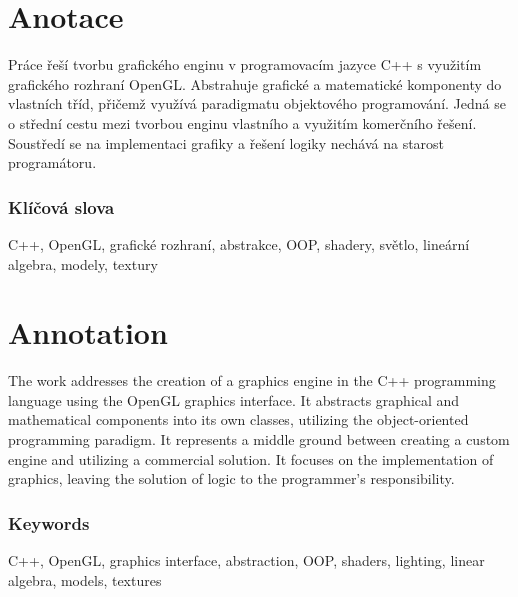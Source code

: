 \section*{Anotace}

Práce řeší tvorbu grafického enginu v programovacím jazyce C++ s využitím grafického rozhraní OpenGL. Abstrahuje grafické a matematické komponenty do vlastních tříd, přičemž využívá paradigmatu objektového programování. Jedná se o střední cestu mezi tvorbou enginu vlastního a využitím komerčního řešení. Soustředí se na implementaci grafiky a řešení logiky nechává na starost programátoru.

\subsubsection*{Klíčová slova}

C++, OpenGL, grafické rozhraní, abstrakce, OOP, shadery, světlo, lineární algebra, modely, textury

\section*{Annotation}

The work addresses the creation of a graphics engine in the C++ programming language using the OpenGL graphics interface. It abstracts graphical and mathematical components into its own classes, utilizing the object-oriented programming paradigm. It represents a middle ground between creating a custom engine and utilizing a commercial solution. It focuses on the implementation of graphics, leaving the solution of logic to the programmer's responsibility.

\subsubsection*{Keywords}

C++, OpenGL, graphics interface, abstraction, OOP, shaders, lighting, linear algebra, models, textures

\thispagestyle{empty}
\pagebreak
